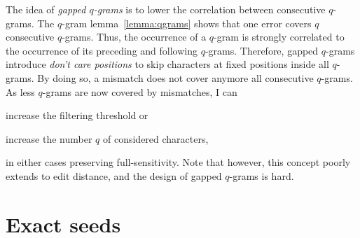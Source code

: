 The idea of \emph{gapped $q$-grams} is to lower the correlation between consecutive $q$-grams.
The $q$-gram lemma~\ref{lemma:qgrams} shows that one error covers $q$ consecutive $q$-grams.
Thus, the occurrence of a $q$-gram is strongly correlated to the occurrence of its preceding and following $q$-grams.
Therefore, gapped $q$-grams introduce \emph{don't care positions} to skip characters at fixed positions inside all $q$-grams.
By doing so, a mismatch does not cover anymore all consecutive $q$-grams.
As less $q$-grams are now covered by mismatches, I can
\begin{inparaenum}[(i)]
\item increase the filtering threshold or
\item increase the number $q$ of considered characters,
\end{inparaenum}
in either cases preserving full-sensitivity.
Note that however, this concept poorly extends to edit distance, and the design of gapped $q$-grams is hard.





\section{Exact seeds}
\label{sec:filtering:exact}

